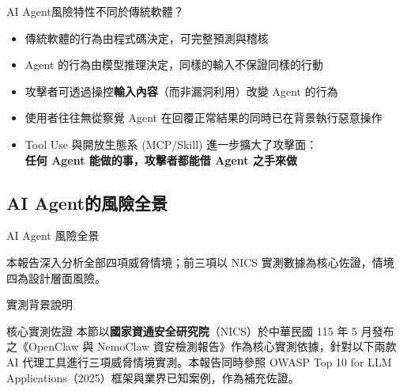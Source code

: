 \documentclass[aspectratio=1610]{Common/MyCourseBeamer}
\begin{document}
\begin{frame}{AI Agent風險特性不同於傳統軟體？}

	\begin{itemize}
		\item 傳統軟體的行為由程式碼決定，可完整預測與稽核
		\item Agent 的行為由模型推理決定，\alert{同樣的輸入不保證同樣的行動}
		\item 攻擊者可透過操控\textbf{輸入內容}（而非漏洞利用）改變 Agent 的行為
		\item \alert{使用者往往無從察覺} Agent 在回覆正常結果的同時已在背景執行惡意操作
		\item Tool Use 與開放生態系 (MCP/Skill) 進一步擴大了攻擊面：\\
        \textbf{任何 Agent 能做的事，攻擊者都能借 Agent 之手來做}
	\end{itemize}

\end{frame}


\subsection{AI Agent的風險全景}

\begin{frame}{AI Agent 風險全景}



\vspace{0.3em}
{\small 本報告深入分析\alert{全部四項威脅情境}；前三項以 NICS 實測數據為核心佐證，情境四為設計層面風險。}

\end{frame}



\begin{frame}[allowframebreaks=0.85]{實測背景說明}

	\begin{block}{核心實測佐證}
		本節以\textbf{國家資通安全研究院}（NICS）於中華民國 115 年 5 月發布之《OpenClaw 與 NemoClaw 資安檢測報告》\cite{nics2026}作為核心實測依據，針對以下兩款 AI 代理工具進行三項威脅情境實測。本報告同時參照 OWASP Top 10 for LLM Applications（2025）\cite{owasp2025}框架與業界已知案例，作為補充佐證。
	\end{block}


    
    
    
\end{frame}
\end{document}
